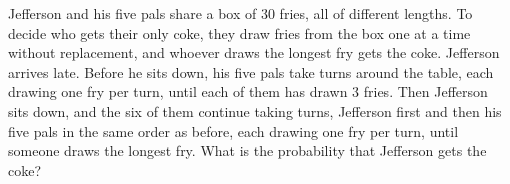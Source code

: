 Jefferson and his five pals share a box of $30$ fries, all of different lengths. To decide who gets their only coke, they draw fries from the box one at a time without replacement, and whoever draws the longest fry gets the coke. Jefferson arrives late. Before he sits down, his five pals take turns around the table, each drawing one fry per turn, until each of them has drawn $3$ fries. Then Jefferson sits down, and the six of them continue taking turns, Jefferson first and then his five pals in the same order as before, each drawing one fry per turn, until someone draws the longest fry. What is the probability that Jefferson gets the coke?
